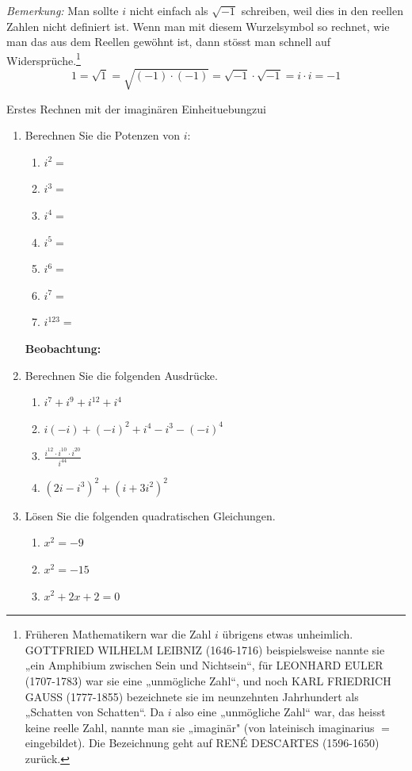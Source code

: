     \emph{Bemerkung:}
Man sollte $i$ nicht einfach als $\sqrt{-1}$ schreiben, weil dies in den reellen Zahlen nicht definiert ist. Wenn man mit diesem Wurzelsymbol so rechnet, wie man das aus dem Reellen gewöhnt ist, dann stösst man schnell auf Widersprüche.\footnote{Früheren Mathematikern war die Zahl $i$ übrigens etwas unheimlich. GOTTFRIED WILHELM LEIBNIZ (1646-1716) beispielsweise nannte sie „ein Amphibium zwischen Sein und Nichtsein“, für LEONHARD EULER (1707-1783) war sie eine „unmögliche Zahl“, und noch KARL FRIEDRICH GAUSS (1777-1855) bezeichnete sie im neunzehnten Jahrhundert als „Schatten von Schatten“. Da $i$ also eine „unmögliche Zahl“ war, das heisst keine reelle Zahl, nannte man sie „imaginär" (von lateinisch imaginarius $=$ eingebildet). Die Bezeichnung geht auf RENÉ DESCARTES (1596-1650) zurück.}
$$1=\sqrt{1}=\sqrt{(-1)\cdot(-1)}=\sqrt{-1}\cdot \sqrt{-1}=i\cdot i=-1$$


\begin{ueb}{Erstes Rechnen mit der imaginären Einheit}{uebungzui}
    \begin{enumerate}
        \item Berechnen Sie die Potenzen von $i$:

\begin{enumerate}
	\item $i^2=$
	\item $i^3=$
	\item $i^4=$
	\item $i^5=$
	\item $i^6=$
	\item $i^7=$
	\item $i^{123}=$
\end{enumerate}


\textbf{Beobachtung:} %

\item Berechnen Sie die folgenden Ausdrücke.

\begin{enumerate}
    \item $i^7 + i^9 + i^{12} + i^4$
    \item $i(-i) + (-i)^2 + i^4 - i^3 - (-i)^4$
    \item $\frac{i^{12} \cdot i^{10} \cdot i^{20}}{i^{44}}$
    \item $(2i - i^3)^2 + (i + 3i^2)^2$
\end{enumerate}
\item Lösen Sie die folgenden quadratischen Gleichungen.

\begin{enumerate}
    \item $x^2 = -9$
    \item $x^2 = -15$
    \item $x^2 + 2x + 2 = 0$
\end{enumerate}
\end{enumerate}
\end{ueb}


